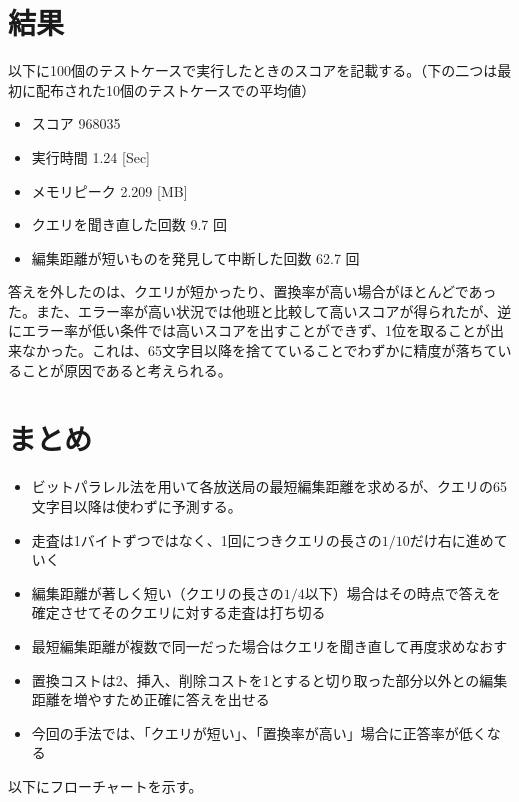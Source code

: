 \documentclass[dvipdfmx]{jsarticle}
\begin{document}
\section{結果}

以下に100個のテストケースで実行したときのスコアを記載する。（下の二つは最初に配布された10個のテストケースでの平均値）

\begin{itemize}
  \item スコア 968035
  \item 実行時間 1.24 [Sec]
  \item メモリピーク 2.209 [MB]
  \item クエリを聞き直した回数 9.7 回
  \item 編集距離が短いものを発見して中断した回数 62.7 回
\end{itemize}

答えを外したのは、クエリが短かったり、置換率が高い場合がほとんどであった。また、エラー率が高い状況では他班と比較して高いスコアが得られたが、逆にエラー率が低い条件では高いスコアを出すことができず、1位を取ることが出来なかった。これは、65文字目以降を捨てていることでわずかに精度が落ちていることが原因であると考えられる。

\section{まとめ}

\begin{itemize}
  \item ビットパラレル法を用いて各放送局の最短編集距離を求めるが、クエリの65文字目以降は使わずに予測する。
  \item 走査は1バイトずつではなく、1回につきクエリの長さの$1/10$だけ右に進めていく
  \item 編集距離が著しく短い（クエリの長さの$1/4$以下）場合はその時点で答えを確定させてそのクエリに対する走査は打ち切る
  \item 最短編集距離が複数で同一だった場合はクエリを聞き直して再度求めなおす
  \item 置換コストは2、挿入、削除コストを1とすると切り取った部分以外との編集距離を増やすため正確に答えを出せる
  \item 今回の手法では、「クエリが短い」、「置換率が高い」場合に正答率が低くなる
\end{itemize}

以下にフローチャートを示す。
\end{document}
